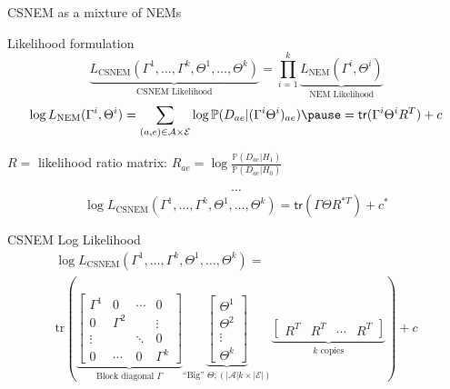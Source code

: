 \documentclass[aspectratio=169]{beamer}
\begin{document}
\begin{frame}{CSNEM as a mixture of NEMs}
\end{frame}


\begin{frame}{Likelihood formulation}
\[
 \underbrace{
  L_\text{CSNEM}(\Gamma^1, \ldots, \Gamma^k, \Theta^1, \ldots, \Theta^k)
 }_{\text{CSNEM Likelihood}}
 = \prod_{i=1}^k
 \underbrace{
  L_\text{NEM}(\Gamma^i, \Theta^i)
 }_{\text{NEM Likelihood}}
\]
\pause
\[
\log L_\text{NEM}(\Gamma^i, \Theta^i) = \sum_{(a,e) \in \mathcal A \times \mathcal E} \log \mathbb P ( D_{ae} | (\Gamma^i \Theta^i)_{ae} ) \pause = \mathsf{tr} ( \Gamma^i \Theta^i R^T ) + c
\]
\begin{center}\small
$R=$ likelihood ratio matrix: $R_{ae} = \log \frac{ \mathbb P( D_{ae} | H_1 ) }{ \mathbb P( D_{ae} | H_0 ) }$
\end{center}
\pause
\[ \cdots \]
\[
\log L_\text{CSNEM}(\Gamma^1, \ldots, \Gamma^k, \Theta^1, \ldots, \Theta^k) = \mathsf{tr}( \Gamma \Theta R^{*T} ) + c^*
\]
\end{frame}


\begin{frame}{CSNEM Log Likelihood}
\begin{multline*}
\log L_\text{CSNEM}( \Gamma^1, \ldots, \Gamma^k, \Theta^1, \ldots, \Theta^k )
 = \\ \mathrm{tr}\left(
 \underbrace{\begin{bmatrix}
	\Gamma^1 & 0 & \cdots & 0 \\
	0 & \Gamma^2 & & \vdots \\
	\vdots & & \ddots & 0 \\
	0 & \cdots & 0 & \Gamma^k
 \end{bmatrix}}_{\text{Block diagonal } \Gamma}
 \underbrace{\begin{bmatrix}
	\Theta^1 \\
	\Theta^2 \\
	\vdots \\
	\Theta^k
 \end{bmatrix}}_{\text{``Big'' } \Theta; (|\mathcal A|k \times |\mathcal E|)}
 \underbrace{\begin{bmatrix}
	R^T & R^T & \cdots & R^T
 \end{bmatrix}}_{k \text{ copies}} \right) + c
\end{multline*}
\end{frame}
\end{document}
